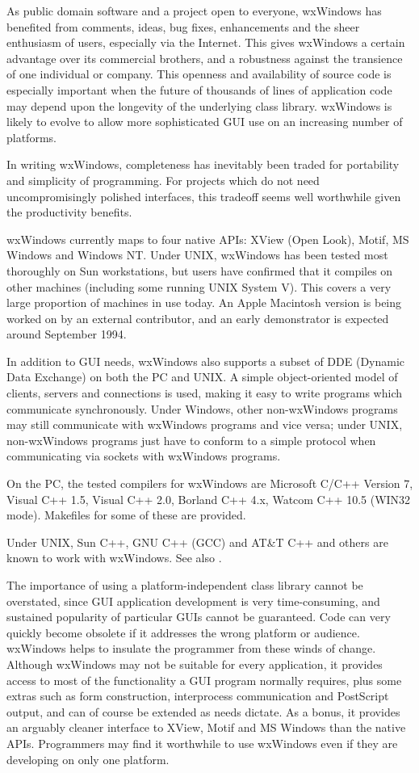 As public domain software and a project open to everyone, wxWindows has
benefited from comments, ideas, bug fixes, enhancements and the sheer
enthusiasm of users, especially via the Internet. This gives wxWindows a
certain advantage over its commercial brothers, and a robustness against
the transience of one individual or company. This openness and
availability of source code is especially important when the future of
thousands of lines of application code may depend upon the longevity of
the underlying class library. wxWindows is likely to evolve to allow
more sophisticated GUI use on an increasing number of platforms.

In writing wxWindows, completeness has inevitably been traded for
portability and simplicity of programming. For projects which do not
need uncompromisingly polished interfaces, this tradeoff seems well
worthwhile given the productivity benefits.

wxWindows currently maps to four native APIs: XView (Open Look), Motif,
MS Windows and Windows NT. Under UNIX, wxWindows has been tested most
thoroughly on Sun workstations, but users have confirmed that it
compiles on other machines (including some running UNIX System V). This
covers a very large proportion of machines in use today. An Apple Macintosh
version is being worked on by an external contributor, and an early demonstrator
is expected around September 1994.

In addition to GUI needs, wxWindows also supports a subset of DDE
(Dynamic Data Exchange) on both the PC and UNIX. A simple
object-oriented model of clients, servers and connections is used,
making it easy to write programs which communicate synchronously. Under
Windows, other non-wxWindows programs may still communicate with
wxWindows programs and vice versa; under UNIX, non-wxWindows programs
just have to conform to a simple protocol when communicating via sockets
with wxWindows programs.

On the PC, the tested compilers for wxWindows are Microsoft C/C++
Version 7, Visual C++ 1.5, Visual C++ 2.0, Borland C++ 4.x, Watcom
C++ 10.5 (WIN32 mode). Makefiles for some of these are provided.

Under UNIX, Sun C++, GNU C++ (GCC) and AT\&T C++ and others are known to work with
wxWindows.  See also .

The importance of using a platform-independent class library cannot be
overstated, since GUI application development is very time-consuming,
and sustained popularity of particular GUIs cannot be guaranteed.
Code can very quickly become obsolete if it addresses the wrong
platform or audience.  wxWindows helps to insulate the programmer from
these winds of change. Although wxWindows may not be suitable for
every application, it provides access to most of the functionality a
GUI program normally requires, plus some extras such as form
construction, interprocess communication and PostScript output, and
can of course be extended as needs dictate.  As a bonus, it provides
an arguably cleaner interface to XView, Motif and MS Windows than the native
APIs. Programmers may find it worthwhile to use wxWindows even if they
are developing on only one platform.

